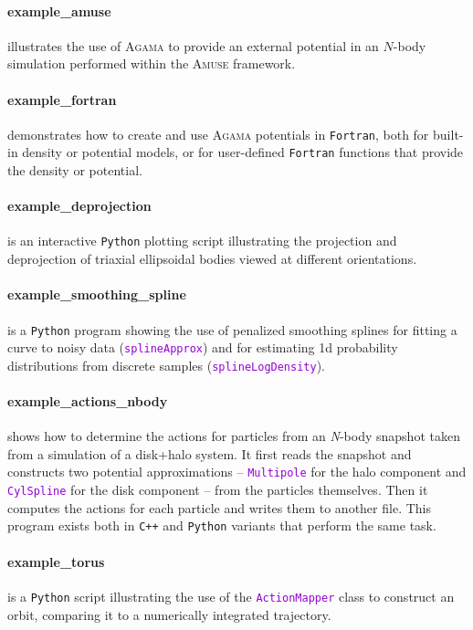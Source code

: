 \documentclass[12pt]{article}
\newcommand{\Agama}{\textsc{Agama}\xspace}
\newcommand{\Amuse}{\textsc{Amuse}\xspace}
\newcommand{\Nbody}{\textsl{N}-body\xspace}
\newcommand{\Cpp}  {\texttt{C++}\xspace}
\newcommand{\Python}{\texttt{Python}\xspace}
\newcommand{\Fortran}{\texttt{Fortran}\xspace}
\newcommand{\ttt}[1]{\textcolor{darkviolet}{\texttt{#1}}}
\begin{document}
\paragraph{example_amuse} illustrates the use of \Agama to provide an external potential in an $N$-body simulation performed within the \Amuse framework.

\paragraph{example_fortran} demonstrates how to create and use \Agama potentials in \Fortran, both for built-in density or potential models, or for user-defined \Fortran functions that provide the density or potential.

\paragraph{example_deprojection} is an interactive \Python plotting script illustrating the projection and deprojection of triaxial ellipsoidal bodies viewed at different orientations.

\paragraph{example_smoothing_spline} is a \Python program showing the use of penalized smoothing splines for fitting a curve to noisy data (\ttt{splineApprox}) and for estimating 1d probability distributions from discrete samples (\ttt{splineLogDensity}).

\paragraph{example_actions_nbody} shows how to determine the actions for particles from an \Nbody snapshot taken from a simulation of a disk+halo system. It first reads the snapshot and constructs two potential approximations -- \ttt{Multipole} for the halo component and \ttt{CylSpline} for the disk component -- from the particles themselves. Then it computes the actions for each particle and writes them to another file. This program exists both in \Cpp and \Python variants that perform the same task.

\paragraph{example_torus} is a \Python script illustrating the use of the \ttt{ActionMapper} class to construct an orbit, comparing it to a numerically integrated trajectory.
\end{document}
